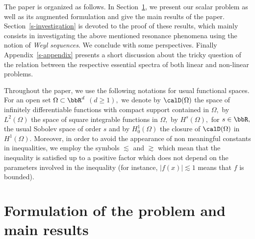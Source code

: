 The paper is organized as follows. In Section~\ref{s-formulation}, we present our scalar problem as well as its augmented formulation and give the main results of the paper. Section~\ref{s-investigation} is devoted to the proof of these results, which mainly consists in investigating the above mentioned resonance phenomena using the notion of \emph{Weyl sequences}. We conclude with some perspectives. Finally Appendix~\ref{s-appendix} presents a short discussion about the tricky question of the relation between the respective essential spectra of both linear and non-linear problems.

Throughout the paper, we use the following notations for usual functional spaces. For an open set $\Omega \subset \bbR^d$ $(d \ge 1),$ we denote by $\calD(\Omega)$ the space of infinitely differentiable functions with compact support contained in $\Omega,$ by $L^2(\Omega)$ the space of square integrable functions in $\Omega,$ by $H^s(\Omega),$ for $s \in \bbR,$ the usual Sobolev space of order $s$ and by $H^1_0(\Omega)$ the closure of $\calD(\Omega)$ in $H^1(\Omega).$ Moreover, in order to avoid the appearance of non meaningful constants in inequalities, we employ the symbols $\lesssim$ and $\gtrsim$ which mean that the inequality is satisfied up to a positive factor which does not depend on the parameters involved in the inequality (for instance, $|f(x)| \lesssim 1$ means that $f$ is bounded).


\section{Formulation of the problem and main results}\label{s-formulation}

